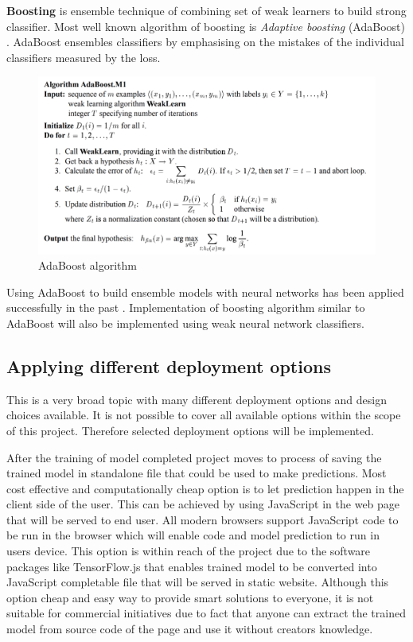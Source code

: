 \documentclass[12pt, twoside, a4paper]{article}
\begin{document}
\textbf{Boosting} is ensemble technique of combining set of weak learners to build strong classifier. Most well known algorithm of boosting is \textit{Adaptive boosting} (AdaBoost) \cite{adaboost}. AdaBoost ensembles classifiers by emphasising on the mistakes of the individual classifiers measured by the loss. 

\begin{figure}[H]%
    \centering
    \includegraphics[width=\textwidth]{img/adaboost.png}%
    \caption{AdaBoost algorithm \cite{adaboost}}%
    \label{fig:adaboost}%
\end{figure}

Using AdaBoost to build ensemble models with neural networks has been applied successfully in the past \cite{Incrementalboosting, boostingneural}. Implementation of boosting algorithm similar to AdaBoost will also be implemented using weak neural network classifiers.

\subsection{Applying different deployment options}
This is a very broad topic with many different deployment options and design choices available. It is not possible to cover all available options within the scope of this project. Therefore selected deployment options will be implemented.

After the training of model completed project moves to process of saving the trained model in standalone file that could be used to make predictions. Most cost effective and computationally cheap option is to let prediction happen in the client side of the user. This can be achieved by using JavaScript in the web page that will be served to end user. All modern browsers support JavaScript code to be run in the browser which will enable code and model prediction to run in users device. This option is within reach of the project due to the software packages like TensorFlow.js \cite{tensorjs} that enables trained model to be converted into JavaScript completable file that will be served in static website. Although this option cheap and easy way to provide smart solutions to everyone, it is not suitable for commercial initiatives due to fact that anyone can extract the trained model from source code of the page and use it without creators knowledge.
\end{document}
